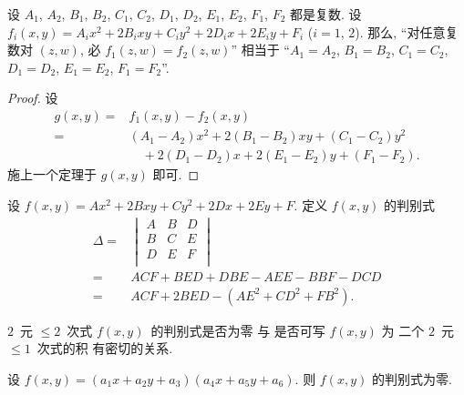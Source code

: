 \documentclass[%
    UTF8,%
    fontset=none,%
    punct=kaiming,%
    zihao=-4,%
    a4paper,%
    oneside,%
]{ctexbook}
\renewcommand*{\leq}{\leqslant}
\begin{document}
\begin{theorem}
    设 \(A_1\), \(A_2\),
    \(B_1\), \(B_2\),
    \(C_1\), \(C_2\),
    \(D_1\), \(D_2\),
    \(E_1\), \(E_2\),
    \(F_1\), \(F_2\)
    都是复数.
    设
    \(f_i (x, y) = A_i x^2 + 2B_i xy + C_i y^2
    + 2D_i x + 2E_i y + F_i\)
    (\(i = 1\), \(2\)).
    那么,
    ``对任意复数对 \((z, w)\), 必 \(f_1 (z, w) = f_2 (z, w)\)''
    相当于
    ``\(A_1 = A_2\), \(B_1 = B_2\), \(C_1 = C_2\),
    \(D_1 = D_2\), \(E_1 = E_2\), \(F_1 = F_2\)''.
\end{theorem}

\begin{proof}
    设
    \begin{align*}
        g(x, y)
        = {} & f_1 (x, y) - f_2 (x, y)
        \\
        = {} &
        (A_1 - A_2) x^2 + 2(B_1 - B_2) xy + (C_1 - C_2) y^2
        \\
             & \quad
        + 2(D_1 - D_2) x + 2(E_1 - E_2) y + (F_1 - F_2).
    \end{align*}
    施上一个定理于 \(g(x, y)\) 即可.
\end{proof}

\begin{definition}
    设 \(f(x, y) = Ax^2 + 2Bxy + Cy^2 + 2Dx + 2Ey + F\).
    定义 \(f(x, y)\) 的判别式
    \begin{align*}
        \Delta
        = {} &
        \begin{vmatrix}
            A & B & D \\
            B & C & E \\
            D & E & F \\
        \end{vmatrix}                            \\
        = {} & ACF + BED + DBE - AEE - BBF - DCD  \\
        = {} & ACF + 2BED - (AE^2 + CD^2 + FB^2).
    \end{align*}
\end{definition}

\(2\)~元 \({\leq} 2\)~次式 \(f(x, y)\)~的判别式是否为零%
与%
是否可写 \(f(x, y)\) 为%
二个 \(2\)~元 \({\leq} 1\)~次式的积%
有密切的关系.

\begin{theorem}
    设 \(f(x, y) = (a_1 x + a_2 y + a_3) (a_4 x + a_5 y + a_6)\).
    则 \(f(x, y)\) 的判别式为零.
\end{theorem}
\end{document}

